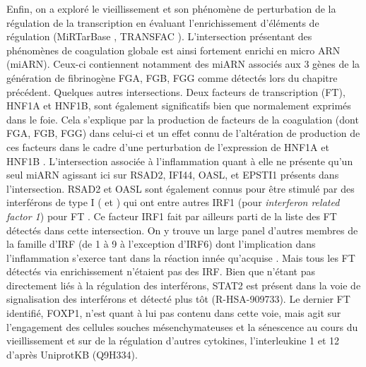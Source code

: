 Enfin, on a exploré le vieillissement et son phénomène de perturbation de la régulation de la transcription en évaluant l'enrichissement d'éléments de régulation (MiRTarBase , TRANSFAC ). L'intersection présentant des phénomènes de coagulation globale est ainsi fortement enrichi en micro ARN (miARN). Ceux-ci contiennent notamment des miARN associés aux 3 gènes de la génération de fibrinogène FGA, FGB, FGG comme détectés lors du chapitre précédent. Quelques autres intersections. Deux facteurs de transcription (FT), HNF1A et HNF1B, sont également significatifs bien que normalement exprimés dans le foie. Cela s'explique par la production de facteurs de la coagulation (dont FGA, FGB, FGG) dans celui-ci et un effet connu de l'altération de production de ces facteurs dans le cadre d'une perturbation de l'expression de HNF1A et HNF1B . L'intersection associée à l'inflammation quant à elle ne présente qu'un seul miARN agissant ici sur RSAD2, IFI44, OASL, et EPSTI1 présents dans l'intersection. RSAD2 et OASL sont également connus pour être stimulé par des interférons de type I (\textalpha{} et \textbeta{}) qui ont entre autres IRF1 (pour \textit{interferon related factor 1}) pour FT . Ce facteur IRF1 fait par ailleurs parti de la liste des FT détectés dans cette intersection. On y trouve un large panel d'autres membres de la famille d'IRF (de 1 à 9 à l'exception d'IRF6) dont l'implication dans l'inflammation s'exerce tant dans la réaction innée qu’acquise . Mais tous les FT détectés via enrichissement n'étaient pas des IRF. Bien que n'étant pas directement liés à la régulation des interférons, STAT2 est présent dans la voie de signalisation des interférons \textalpha{} et \textbeta{} détecté plus tôt (R-HSA-909733). Le dernier FT identifié, FOXP1, n'est quant à lui pas contenu dans cette voie, mais agit sur l'engagement des cellules souches mésenchymateuses et la sénescence au cours du vieillissement  et sur de la régulation d'autres cytokines, l'interleukine 1 et 12 d'après UniprotKB (Q9H334).

